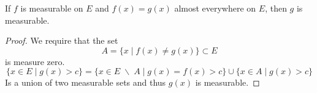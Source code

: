 \vspace{2ex}
\begin{thm}
If $f$ is measurable on $E$ and $f(x)=g(x)$ almost everywhere on $E$, then $g$ is measurable.
\end{thm}
\vspace{2ex}
\begin{proof}
We require that the set
\[A=\{x \;|\; f(x)\ne g(x)\}\subset E\]
is measure zero. 
\[\{x\in E \;|\; g(x)>c\}=\{x\in E\;\backslash\;A \;|\; g(x)=f(x)>c\}\cup \{x\in A \;|\; g(x)>c\}\]
Is a union of two measurable sets and thus $g(x)$ is measurable. 
\end{proof}
\vspace{2ex}


